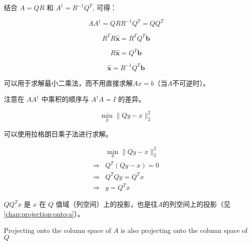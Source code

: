 结合 $A=Q R$ 和 $A^{\dagger}=R^{-1} Q^{T}$, 可得：

\begin{theorem}
    $$
A A^{\dagger}=Q R R^{-1} Q^{T}=Q Q^{T}
$$
\end{theorem}

\begin{theorem}
    $$R^{ {T}} R \widehat{\boldsymbol{x}}=R^{ {T}} Q^{ {T}} \boldsymbol{b}$$

    $$R \widehat{\boldsymbol{x}}=Q^{ {T}} \boldsymbol{b}$$

    $$\widehat{\boldsymbol{x}}=R^{-1} Q^{ {T}} \boldsymbol{b}$$


可以用于求解最小二乘法，而不用直接求解$Ax=b$（当$A$不可逆时）。
\end{theorem}

\begin{remark}
    注意在 $A A^{\dagger}$ 中乘积的顺序与 $A^{\dagger} A=I$ 的差异。
\end{remark}

\begin{problem}[投影问题]
    $$\min _{y}\|Q y-x\|_{2}^{2}$$
\end{problem}

可以使用拉格朗日乘子法进行求解。

$$
\begin{aligned}
&\min _{y}\|Q y-x\|_{2}^{2}\\
 \Rightarrow& Q^{T}(Q y-x)=0 \\
\Rightarrow& Q^{T} Q y=Q^{T} x\\ 
\Rightarrow & y=Q^{T} x
\end{aligned}
$$

$Q Q^{T} x$ 是 $x$ 在 $Q$ 值域（列空间）上的投影，也是往$A$的列空间上的投影（见\ref{chap:projection-onto-a}）。 

\begin{FigureCenter}{Projecting onto the column space of $A$ is also projecting onto the column space of $Q$}
    
\end{FigureCenter}


